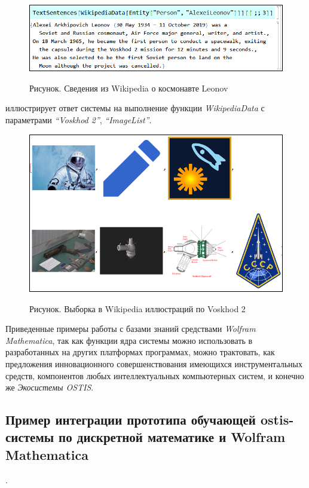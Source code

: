 \begin{figure}[H]
	\caption{Рисунок. Сведения из Wikipedia о космонавте Leonov}
	\includegraphics[scale=0.55]{images/part7/chapter_integration/integr_alg6.png}
	\label{fig:integr_alg6}
\end{figure}

\textit{} иллюстрирует ответ системы на выполнение функции \textit{WikipediaData} с параметрами \textit{``Voskhod 2''}, \textit{``ImageList''}.

\begin{figure}[H]
	\caption{Рисунок. Выборка в Wikipedia иллюстраций по Voskhod 2}
	\includegraphics[scale=0.56]{images/part7/chapter_integration/integr_alg7.png}
	\label{fig:integr_alg7}
\end{figure}

Приведенные примеры работы с базами знаний средствами \textit{Wolfram Mathematica}, так как функции ядра системы можно использовать в разработанных на других платформах программах, можно трактовать, как предложения инновационного совершенствования имеющихся инструментальных средств, компонентов любых интеллектуальных компьютерных систем, и конечно же \textit{Экосистемы OSTIS}.

\subsection{Пример интеграции прототипа обучающей ostis-системы по дискретной математике и Wolfram Mathematica}.
\label{subsec_cas_intergation}

